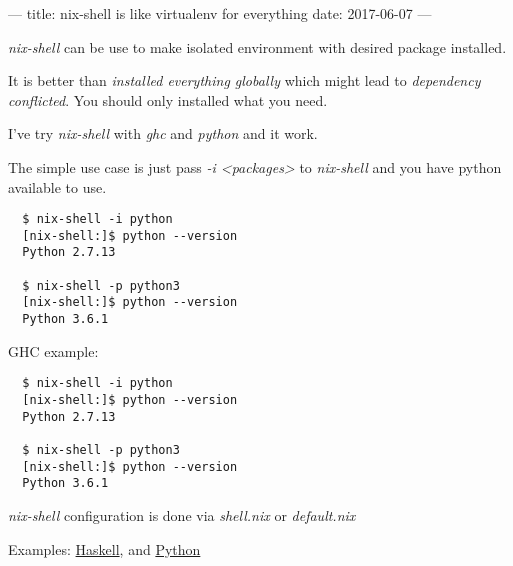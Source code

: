 ---
title: nix-shell is like virtualenv for everything
date: 2017-06-07
---


\textit{nix-shell} can be use to make isolated environment with desired package installed. 

It is better than \textit{installed everything globally} which might lead to \textit{dependency conflicted}.
You should only installed what you need.

I've try \textit{nix-shell} with \textit{ghc} and \textit{python} and it work.

The simple use case is just pass \textit{-i <packages>} to \textit{nix-shell} and you have python available to use.

\begin{verbatim}
  $ nix-shell -i python
  [nix-shell:]$ python --version
  Python 2.7.13

  $ nix-shell -p python3
  [nix-shell:]$ python --version
  Python 3.6.1
\end{verbatim}

GHC example:

\begin{verbatim}
  $ nix-shell -i python
  [nix-shell:]$ python --version
  Python 2.7.13

  $ nix-shell -p python3
  [nix-shell:]$ python --version
  Python 3.6.1
\end{verbatim}


\textit{nix-shell} configuration is done via \textit{shell.nix} or \textit{default.nix}

Examples: \href{../nix-vim-haskell}{Haskell}, and \href{../nix-vim-python}{Python}





